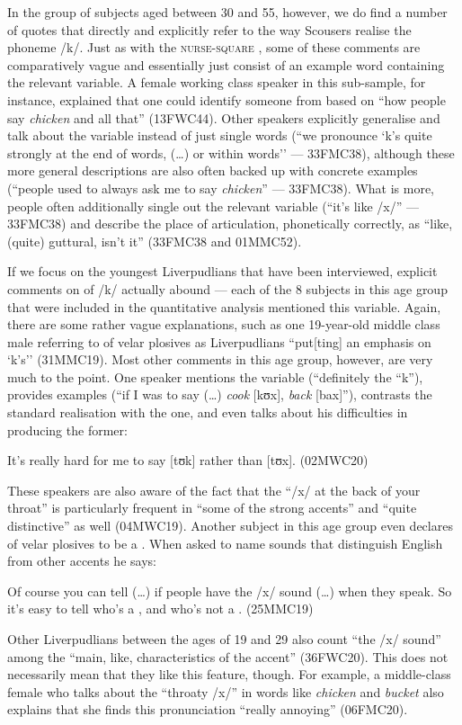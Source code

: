 In the group of subjects aged between 30 and 55, however, we do find a number of quotes that directly and explicitly refer to the way Scousers realise the phoneme /k/.
Just as with the \textsc{nurse}-\textsc{square} , some of these comments are comparatively vague and essentially just consist of an example word containing the relevant variable.
A female working class speaker in this sub-sample, for instance, explained that one could identify someone from  based on ``how people say \emph{chicken} and all that'' (13FWC44).
Other speakers explicitly generalise and talk about the variable instead of just single words (``we pronounce `k's quite strongly at the end of words, (\ldots) or within words'' --- 33FMC38), although these more general descriptions are also often backed up with concrete examples (``people used to always ask me to say \emph{chicken}'' --- 33FMC38).
What is more, people often additionally single out the relevant variable (``it's like /x/'' --- 33FMC38) and describe the place of articulation, phonetically correctly, as ``like, (quite) guttural, isn't it'' (33FMC38 and 01MMC52).

If we focus on the youngest Liverpudlians that have been interviewed, explicit comments on  of /k/ actually abound --- each of the 8 subjects in this age group that were included in the quantitative analysis mentioned this variable.
Again, there are some rather vague explanations, such as one 19-year-old middle class male referring to  of velar plosives as Liverpudlians ``put[ting] an emphasis on `k's'' (31MMC19).
Most other comments in this age group, however, are very much to the point.
One speaker mentions the variable (``definitely the ``k''), provides examples (``if I was to say (\ldots) \emph{cook} [kʊx], \emph{back} [bax]''), contrasts the standard realisation with the  one, and even talks about his difficulties in producing the former: 
\begin{example}
	It's really hard for me to say [tʊk] rather than [tʊx]. (02MWC20)
\end{example}

These speakers are also aware of the fact that the ``/x/ at the back of your throat'' is particularly frequent in ``some of the strong accents'' and ``quite distinctive'' as well (04MWC19).
Another subject in this age group even declares  of velar plosives to be a .
When asked to name sounds that distinguish  English from other accents he says:
\begin{example}
	Of course you can tell (\ldots) if people have the /x/ sound (\ldots) when they speak.
	So it's easy to tell who's a , and who's not a . (25MMC19)
\end{example}
Other Liverpudlians between the ages of 19 and 29 also count ``the /x/ sound'' among the ``main, like, characteristics of the accent'' (36FWC20).
This does not necessarily mean that they like this feature, though.
For example, a middle-class female who talks about the ``throaty /x/'' in words like \emph{chicken} and \emph{bucket} also explains that she finds this pronunciation ``really annoying'' (06FMC20).

